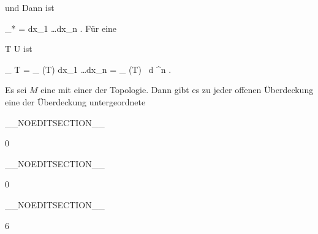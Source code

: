 {{ und
 Dann ist

\mavergleichskettedisp
{\vergleichskette
{  \alpha_* \omega
}
{ =} {  dx_1 \wedge \ldots \wedge dx_n
}
{ } {
}
{ } {
}
{ } {
}
}
{}{}{.}
Für eine

\mavergleichskette
{\vergleichskette
{ T
}
{ \subseteq }{ U
}
{  }{
}
{    }{
}
{   }{
}
}
{}{}{}
ist

\mavergleichskettedisp
{\vergleichskette
{
\int_{  T   }  \omega
}
{ =} {
\int_{ \alpha(T)  }    dx_1 \wedge \ldots \wedge dx_n
}
{ =} { \int_{ \alpha(T)  }       \,  d \lambda^n
}
{ } {
}
{ } {
}
}
{}{}{.}}{Es sei $M$ eine
mit einer
der Topologie. Dann gibt es zu jeder offenen Überdeckung eine der Überdeckung untergeordnete
}

 }

__NOEDITSECTION__

{0}

{

}
{  }

__NOEDITSECTION__

{0}

{

}
{  }

__NOEDITSECTION__

{6}


